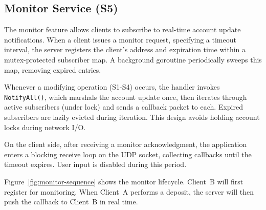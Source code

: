 \documentclass[9pt,a4paper]{article}
\begin{document}
\subsection{Monitor Service (S5)}

The monitor feature allows clients to subscribe to real-time account update notifications. When a client issues a monitor request, specifying a timeout interval, the server registers the client's address and expiration time within a mutex-protected subscriber map. A background goroutine periodically sweeps this map, removing expired entries.

Whenever a modifying operation (S1-S4) occurs, the handler invokes \texttt{NotifyAll()}, which marshals the account update once, then iterates through active subscribers (under lock) and sends a callback packet to each. Expired subscribers are lazily evicted during iteration. This design avoids holding account locks during network I/O.

On the client side, after receiving a monitor acknowledgment, the application enters a blocking receive loop on the UDP socket, collecting callbacks until the timeout expires. User input is disabled during this period. 

Figure~\ref{fig:monitor-sequence} shows the monitor lifecycle.
Client~B will first register for monitoring. 
When Client~A performs a deposit, the server will then push the callback to Client~B in real time.
 
\end{document}
